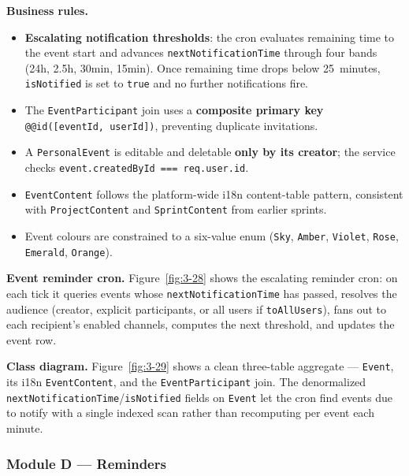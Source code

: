 \textbf{Business rules.}
\begin{itemize}
  \item \textbf{Escalating notification thresholds}: the cron evaluates remaining time to the
    event start and advances \texttt{nextNotificationTime} through four bands (24h, 2.5h, 30min,
    15min). Once remaining time drops below 25~minutes, \texttt{isNotified} is set to \texttt{true}
    and no further notifications fire.
  \item The \texttt{EventParticipant} join uses a \textbf{composite primary key}
    \texttt{@@id([eventId, userId])}, preventing duplicate invitations.
  \item A \texttt{PersonalEvent} is editable and deletable \textbf{only by its creator}; the
    service checks \texttt{event.createdById === req.user.id}.
  \item \texttt{EventContent} follows the platform-wide i18n content-table pattern, consistent
    with \texttt{ProjectContent} and \texttt{SprintContent} from earlier sprints.
  \item Event colours are constrained to a six-value enum (\texttt{Sky}, \texttt{Amber},
    \texttt{Violet}, \texttt{Rose}, \texttt{Emerald}, \texttt{Orange}).
\end{itemize}

\textbf{Event reminder cron.} Figure~\ref{fig:3-28} shows the escalating reminder cron: on each
tick it queries events whose \texttt{nextNotificationTime} has passed, resolves the audience
(creator, explicit participants, or all users if \texttt{toAllUsers}), fans out to each
recipient's enabled channels, computes the next threshold, and updates the event row.


\textbf{Class diagram.} Figure~\ref{fig:3-29} shows a clean three-table aggregate ---
\texttt{Event}, its i18n \texttt{EventContent}, and the \texttt{EventParticipant} join. The
denormalized \texttt{nextNotificationTime}/\texttt{isNotified} fields on \texttt{Event} let the
cron find events due to notify with a single indexed scan rather than recomputing per event
each minute.


\subsubsection{Module D --- Reminders}


